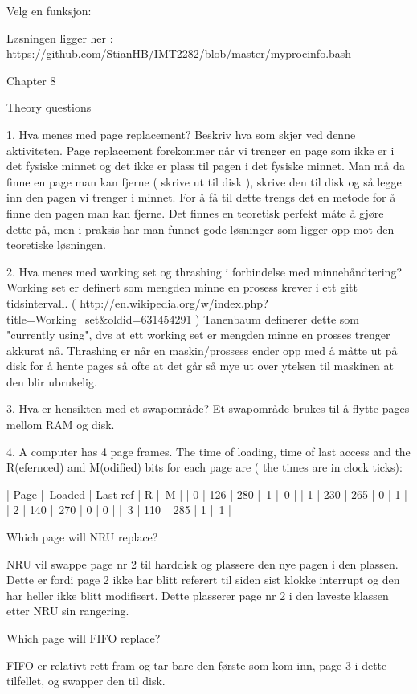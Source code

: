 Velg en funksjon:

Løsningen ligger her : https://github.com/StianHB/IMT2282/blob/master/myprocinfo.bash


Chapter 8

Theory questions

1. Hva menes med page replacement? Beskriv hva som skjer ved denne aktiviteten.
Page replacement forekommer når vi trenger en page som ikke er i det fysiske minnet og det ikke er plass til pagen i det fysiske minnet. Man må da finne en page man kan fjerne ( skrive ut til disk ), skrive den til disk og så legge inn den pagen vi trenger i minnet. For å få til dette trengs det en metode for å finne den pagen man kan fjerne. Det finnes en teoretisk perfekt måte å gjøre dette på, men i praksis har man funnet gode løsninger som ligger opp mot den teoretiske løsningen.

2. Hva menes med working set og thrashing i forbindelse med minnehåndtering?
Working set er definert som mengden minne en prosess krever i ett gitt tidsintervall. ( http://en.wikipedia.org/w/index.php?title=Working_set&oldid=631454291 ) Tanenbaum definerer dette som "currently using", dvs at ett working set er mengden minne en prosses trenger akkurat nå. Thrashing er når en maskin/prossess ender opp med å måtte ut på disk for å hente pages så ofte at det går så mye ut over ytelsen til maskinen at den blir ubrukelig.

3. Hva er hensikten med et swapområde?
Et swapområde brukes til å flytte pages mellom RAM og disk.

4. A computer has 4 page frames. The time of loading, time of last access and the R(efernced) and M(odified) bits for each page are ( the times are in clock ticks):

| Page | Loaded | Last ref | R | M |
| 0    | 126    | 280      | 1 | 0 |
| 1    | 230    | 265      | 0 | 1 |
| 2    | 140    | 270      | 0 | 0 |
| 3    | 110    | 285      | 1 | 1 |

Which page will NRU replace?

NRU vil swappe page nr 2 til harddisk og plassere den nye pagen i den plassen. Dette er fordi page 2 ikke har blitt referert til siden sist klokke interrupt og den har heller ikke blitt modifisert. Dette plasserer page nr 2 i den laveste klassen etter NRU sin rangering.

Which page will FIFO replace?

FIFO er relativt rett fram og tar bare den første som kom inn, page 3 i dette tilfellet, og swapper den til disk.

